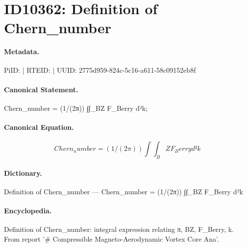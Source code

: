 \section*{ID10362: Definition of Chern\_number}
\paragraph{Metadata.}
PiID:  | RTEID:  | UUID: 2775d959-824c-5c16-a611-58c09152eb8f

\paragraph{Canonical Statement.}
Chern\_number = (1/(2π)) ∫∫\_BZ F\_Berry d²k;

\paragraph{Canonical Equation.}
\[
Chern_number = (1/(2π)) ∫∫_BZ F_Berry d²k
\]

\paragraph{Dictionary.}
Definition of Chern\_number — Chern\_number = (1/(2π)) ∫∫\_BZ F\_Berry d²k

\paragraph{Encyclopedia.}
Definition of Chern\_number: integral expression relating π, BZ, F\_Berry, k. From report '\# Compressible Magneto-Aerodynamic Vortex Core Ana'.
